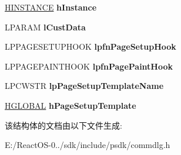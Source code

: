 \begin{DoxyCompactItemize}
\hyperlink{interfacevoid}{H\+I\+N\+S\+T\+A\+N\+CE} {\bfseries h\+Instance}
\item 
\mbox{\label{structtag_p_s_d_w_aa851ef13e7ab467e06c1b17b7edcc396}} 
L\+P\+A\+R\+AM {\bfseries l\+Cust\+Data}
\item 
\mbox{\label{structtag_p_s_d_w_a2de4a8ed1529ba72438f468fe8a46afa}} 
L\+P\+P\+A\+G\+E\+S\+E\+T\+U\+P\+H\+O\+OK {\bfseries lpfn\+Page\+Setup\+Hook}
\item 
\mbox{\label{structtag_p_s_d_w_a2cc50403d0087b67d095f10b97a64e1b}} 
L\+P\+P\+A\+G\+E\+P\+A\+I\+N\+T\+H\+O\+OK {\bfseries lpfn\+Page\+Paint\+Hook}
\item 
\mbox{\label{structtag_p_s_d_w_a1481d3211d7a8e83df9861cce58a555b}} 
L\+P\+C\+W\+S\+TR {\bfseries lp\+Page\+Setup\+Template\+Name}
\item 
\mbox{\label{structtag_p_s_d_w_ad98e294d5ed0ce88f28f956052ae60bf}} 
\hyperlink{interfacevoid}{H\+G\+L\+O\+B\+AL} {\bfseries h\+Page\+Setup\+Template}
\end{DoxyCompactItemize}


该结构体的文档由以下文件生成\+:\begin{DoxyCompactItemize}
\item 
E\+:/\+React\+O\+S-\/0../sdk/include/psdk/commdlg.\+h\end{DoxyCompactItemize}
